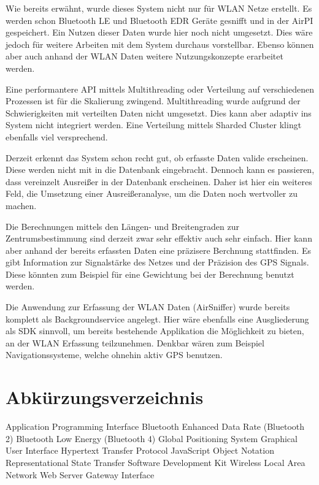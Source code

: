 \documentclass[11pt,a4paper]{article}
\begin{document}
Wie bereits erwähnt, wurde dieses System nicht nur für WLAN Netze erstellt. Es werden schon Bluetooth LE und Bluetooth EDR Geräte gesnifft und in der AirPI gespeichert. Ein Nutzen dieser Daten wurde hier noch nicht umgesetzt. Dies wäre jedoch für weitere Arbeiten mit dem System durchaus vorstellbar. Ebenso können aber auch anhand der WLAN Daten weitere Nutzungskonzepte erarbeitet werden.

Eine performantere API mittels Multithreading oder Verteilung auf verschiedenen Prozessen ist für die Skalierung zwingend. Multithreading wurde aufgrund der Schwierigkeiten mit verteilten Daten nicht umgesetzt. Dies kann aber adaptiv ins System nicht integriert werden. Eine Verteilung mittels Sharded Cluster klingt ebenfalls viel versprechend.

Derzeit erkennt das System schon recht gut, ob erfasste Daten valide erscheinen. Diese werden nicht mit in die Datenbank eingebracht. Dennoch kann es passieren, dass vereinzelt Ausreißer in der Datenbank erscheinen. Daher ist hier ein weiteres Feld, die Umsetzung einer Ausreißeranalyse, um die Daten noch wertvoller zu machen.

Die Berechnungen mittels den Längen- und Breitengraden zur Zentrumsbestimmung sind derzeit zwar sehr effektiv auch sehr einfach. Hier kann aber anhand der bereits erfassten Daten eine präzisere Berchnung stattfinden. Es gibt Information zur Signalstärke des Netzes und der Präzision des GPS Signals. Diese könnten zum Beispiel für eine Gewichtung bei der Berechnung benutzt werden.

Die Anwendung zur Erfassung der WLAN Daten (AirSniffer) wurde bereits komplett als Backgroundservice angelegt. Hier wäre ebenfalls eine Ausgliederung als SDK sinnvoll, um bereits bestehende Applikation die Möglichkeit zu bieten, an der WLAN Erfassung teilzunehmen. Denkbar wären zum Beispiel Navigationssysteme, welche ohnehin aktiv GPS benutzen. 

\newpage
\section{Abkürzungsverzeichnis}

\begin{acronym}
		{Application Programming Interface}
	{Bluetooth Enhanced Data Rate (Bluetooth 2)} 
	{Bluetooth Low Energy (Bluetooth 4)}
		{Global Positioning System}
		{Graphical User Interface }
		{Hypertext Transfer Protocol}
		{JavaScript Object Notation}
		{Representational State Transfer}
		{Software Development Kit}
		{Wireless Local Area Network}
		{Web Server Gateway Interface}

\end{acronym}
\end{document}
